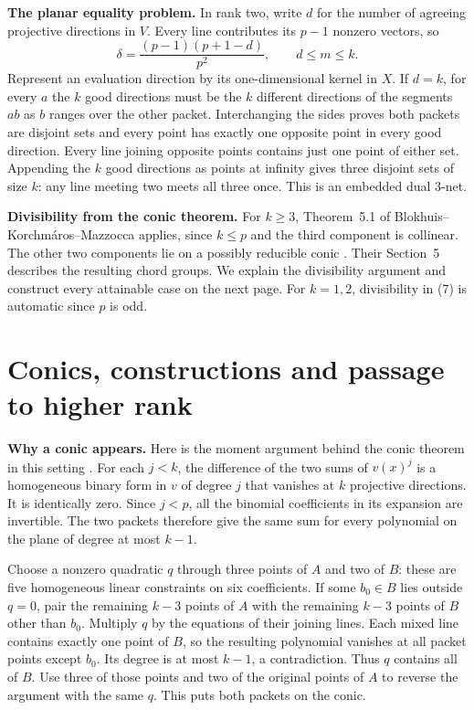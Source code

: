 \documentclass[11pt,letterpaper]{article}
\newcommand{\heading}[1]{\section*{\color{ink}#1}}
\newcommand{\subhead}[1]{\par\smallskip\noindent\textbf{#1.}\enspace}
\begin{document}
\subhead{The planar equality problem}
In rank two, write $d$ for the number of agreeing projective directions in $V$. Every line contributes its $p-1$ nonzero vectors, so
\[
                  \delta=\frac{(p-1)(p+1-d)}{p^2},\qquad d\le m\le k. \tag{9}
\]
Represent an evaluation direction by its one-dimensional kernel in $X$. If $d=k$, for every $a$ the $k$ good directions must be the $k$ different directions of the segments $ab$ as $b$ ranges over the other packet. Interchanging the sides proves both packets are disjoint sets and every point has exactly one opposite point in every good direction. Every line joining opposite points contains just one point of either set. Appending the $k$ good directions as points at infinity gives three disjoint sets of size $k$: any line meeting two meets all three once. This is an embedded dual $3$-net.

\subhead{Divisibility from the conic theorem}
For $k\ge3$, Theorem~5.1 of Blokhuis--Korchm\'aros--Mazzocca applies, since $k\le p$ and the third component is collinear. The other two components lie on a possibly reducible conic \cite{BKM}. Their Section~5 describes the resulting chord groups. We explain the divisibility argument and construct every attainable case on the next page. For $k=1,2$, divisibility in (7) is automatic since $p$ is odd.

\newpage
\heading{Conics, constructions and passage to higher rank}
\subhead{Why a conic appears}
Here is the moment argument behind the conic theorem in this setting \cite{BKM}. For each $j<k$, the difference of the two sums of $v(x)^j$ is a homogeneous binary form in $v$ of degree $j$ that vanishes at $k$ projective directions. It is identically zero. Since $j<p$, all the binomial coefficients in its expansion are invertible. The two packets therefore give the same sum for every polynomial on the plane of degree at most $k-1$.

Choose a nonzero quadratic $q$ through three points of $A$ and two of $B$: these are five homogeneous linear constraints on six coefficients. If some $b_0\in B$ lies outside $q=0$, pair the remaining $k-3$ points of $A$ with the remaining $k-3$ points of $B$ other than $b_0$. Multiply $q$ by the equations of their joining lines. Each mixed line contains exactly one point of $B$, so the resulting polynomial vanishes at all packet points except $b_0$. Its degree is at most $k-1$, a contradiction. Thus $q$ contains all of $B$. Use three of those points and two of the original points of $A$ to reverse the argument with the same $q$. This puts both packets on the conic.
\end{document}
